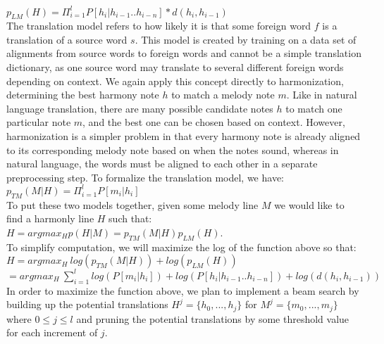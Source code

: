 \documentclass{sig-alternate}
\begin{document}
$p_{LM}(H) = \Pi_{i = 1}^{l} P[h_{i} | h_{i - 1} .. h_{i - n}] * d(h_{i}, h_{i-1})$\\

The translation model refers to how likely it is that some foreign word $f$ is
a translation of a source word $s$. This model is created by training on a data set of alignments from source words to foreign words and cannot be a simple translation dictionary, as one source word may translate to several different foreign words depending on
context. We again apply this concept directly to harmonization, determining the best harmony note $h$ to match a melody note $m$. Like in natural language translation, there are many possible candidate notes $h$ to match one particular note $m$, and the best one can be chosen based on context. However, harmonization is a simpler problem in that every harmony note is already aligned to its corresponding melody note based on when the notes sound, whereas in natural language, the words must be aligned to each other in a separate preprocessing step. To formalize the translation model, we have:\\

$p_{TM}(M | H) = \Pi_{i = 1}^{l} P[m_{i} | h_{i}]$\\

To put these two models together, given some melody line $M$ we would like to find a harmonly line $H$ such that:\\

$H = argmax_{H}p(H | M) = p_{TM}(M | H)p_{LM}(H)$.\\

To simplify computation, we will maximize the log of the function above so that:\\

$H = argmax_{H}\ log(p_{TM}(M | H)) + log(p_{LM}(H))$\\

$= argmax_{H}\ \sum_{i = 1}^{l} log(P[m_{i} | h_{i}]) + log(P[h_{i} | h_{i - 1} .. h_{i - n}]) + log(d(h_{i}, h_{i-1}))$\\

In order to maximize the function above, we plan to implement a beam search by building up the potential translations $H^{j} = \{h_{0}, ... , h_{j}\}$ for $M^{j} = \{m_{0}, ... , m_{j}\}$ where $0 \leq j \leq l$ and pruning the potential translations by some threshold value for each increment of $j$.\\
\end{document}
